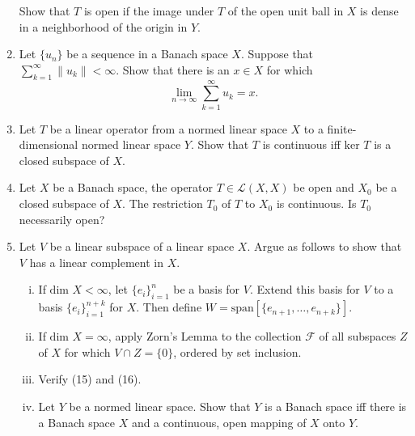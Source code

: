 \begin{enumerate}
    Show that $T$ is open if the image under $T$ of the open unit ball in $X$ is dense in a neighborhood of the origin in $Y$.
    \item Let $\{u_n\}$ be a sequence in a Banach space $X$.
    Suppose that $\sum_{k=1}^\infty\|u_k\|<\infty$.
    Show that there is an $x\in X$ for which
    \[
        \lim_{n\to\infty}\sum_{k=1}^\infty u_k=x.
    \]
    \item Let $T$ be a linear operator from a normed linear space $X$ to a finite-dimensional normed linear space $Y$.
    Show that $T$ is continuous iff $\text{ker }T$ is a closed subspace of $X$.
    \item Let $X$ be a Banach space, the operator $T\in\mathcal{L}(X,X)$ be open and $X_0$ be a closed subspace of $X$.
    The restriction $T_0$ of $T$ to $X_0$ is continuous.
    Is $T_0$ necessarily open?
    \item Let $V$ be a linear subspace of a linear space $X$.
    Argue as follows to show that $V$ has a linear complement in $X$.
    \begin{enumerate}[(i)]
        \item If $\text{dim }X<\infty$, let $\{e_i\}_{i=1}^n$ be a basis for $V$.
        Extend this basis for $V$ to a basis $\{e_i\}_{i=1}^{n+k}$ for $X$.
        Then define $W=\text{span}[\{e_{n+1},\dots,e_{n+k}\}]$.
        \item If $\text{dim }X=\infty$, apply Zorn's Lemma to the collection $\mathcal{F}$ of all subspaces $Z$ of $X$ for which $V\cap Z=\{0\}$, ordered by set inclusion.
        \item Verify (15) and (16).
        \item Let $Y$ be a normed linear space.
        Show that $Y$ is a Banach space iff there is a Banach space $X$ and a continuous, open mapping of $X$ onto $Y$.
    \end{enumerate}
\end{enumerate}

